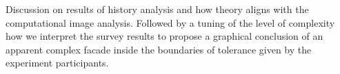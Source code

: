 
Discussion on results of history analysis and how theory aligns with the computational image analysis.
Followed by a tuning of the level of complexity how we interpret the survey results to propose a graphical conclusion of an apparent complex facade inside the boundaries of tolerance given by the experiment participants.
